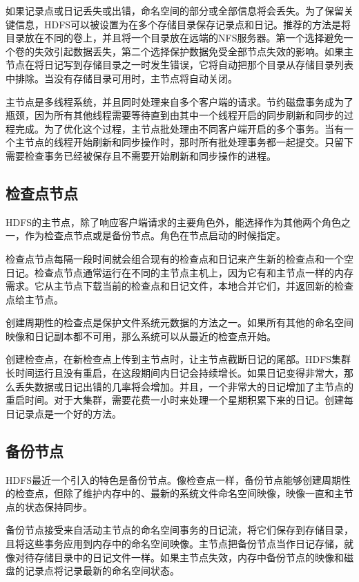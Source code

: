 如果记录点或日记丢失或出错，命名空间的部分或全部信息将会丢失。为了保留关键信息，HDFS可以被设置为在多个存储目录保存记录点和日记。推荐的方法是将目录放在不同的卷上，并且将一个目录放在远端的NFS服务器。第一个选择避免一个卷的失效引起数据丢失，第二个选择保护数据免受全部节点失效的影响。如果主节点在将日记写到存储目录之一时发生错误，它将自动把那个目录从存储目录列表中排除。当没有存储目录可用时，主节点将自动关闭。

主节点是多线程系统，并且同时处理来自多个客户端的请求。节约磁盘事务成为了瓶颈，因为所有其他线程需要等待直到由其中一个线程开启的同步刷新和同步的过程完成。为了优化这个过程，主节点批处理由不同客户端开启的多个事务。当有一个主节点的线程开始刷新和同步操作时，那时所有批处理事务都一起提交。只留下需要检查事务已经被保存且不需要开始刷新和同步操作的进程。

\subsection{检查点节点}

HDFS的主节点，除了响应客户端请求的主要角色外，能选择作为其他两个角色之一，作为检查点节点或是备份节点。角色在节点启动的时候指定。

检查点节点每隔一段时间就会组合现有的检查点和日记来产生新的检查点和一个空日记。检查点节点通常运行在不同的主节点主机上，因为它有和主节点一样的内存需求。它从主节点下载当前的检查点和日记文件，本地合并它们，并返回新的检查点给主节点。

创建周期性的检查点是保护文件系统元数据的方法之一。如果所有其他的命名空间映像和日记副本都不可用，那么系统可以从最近的检查点开始。

创建检查点，在新检查点上传到主节点时，让主节点截断日记的尾部。HDFS集群长时间运行且没有重启，在这段期间内日记会持续增长。如果日记变得非常大，那么丢失数据或日记出错的几率将会增加。并且，一个非常大的日记增加了主节点的重启时间。对于大集群，需要花费一小时来处理一个星期积累下来的日记。创建每日记录点是一个好的方法。

\subsection{备份节点}

HDFS最近一个引入的特色是备份节点。像检查点一样，备份节点能够创建周期性的检查点，但除了维护内存中的、最新的系统文件命名空间映像，映像一直和主节点的状态保持同步。

备份节点接受来自活动主节点的命名空间事务的日记流，将它们保存到存储目录，且将这些事务应用到内存中的命名空间映像。主节点把备份节点当作日记存储，就像对待存储目录中的日记文件一样。如果主节点失效，内存中备份节点的映像和磁盘的记录点将记录最新的命名空间状态。

